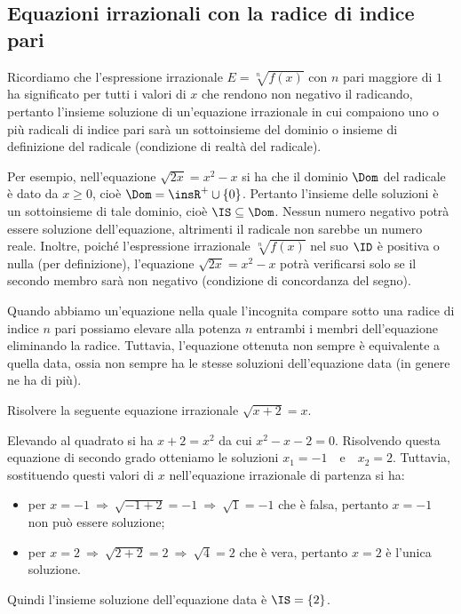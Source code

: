 \subsection{Equazioni irrazionali con la radice di indice pari}

Ricordiamo che l'espressione irrazionale $E=\sqrt[n]{f(x)}$ con $n$ pari maggiore di $1$ ha significato per tutti i valori di $x$ che rendono non negativo il radicando, pertanto l'insieme soluzione di un'equazione irrazionale in cui compaiono uno o più radicali di indice pari sarà un sottoinsieme del dominio o insieme di definizione del radicale (condizione di realtà del radicale).

Per esempio, nell'equazione $\sqrt{2x}=x^2-x$ si ha che il dominio $\Dom$ del radicale è dato da $x\ge 0$, cioè $\Dom=\insR^{+}\cup \{0\}$. Pertanto l'insieme delle soluzioni è un sottoinsieme di tale dominio, cioè $\IS\subseteq \Dom$. Nessun numero negativo potrà essere soluzione dell'equazione, altrimenti il radicale non sarebbe un numero reale.
Inoltre, poiché l'espressione irrazionale $\sqrt[n]{f(x)}$ nel suo $\ID$ è positiva o nulla (per definizione), l'equazione $\sqrt{2x}=x^2-x$ potrà verificarsi solo se il secondo membro sarà non negativo (condizione di concordanza del segno).

Quando abbiamo un'equazione nella quale l'incognita compare sotto una radice di indice $n$ pari possiamo elevare alla potenza $n$ entrambi i membri dell'equazione eliminando la radice. Tuttavia, l'equazione ottenuta non sempre è equivalente a quella data, ossia non sempre ha le stesse soluzioni dell'equazione data (in genere ne ha di più).

\begin{exrig}
\begin{esempio}
Risolvere la seguente equazione irrazionale $ \sqrt{x+2}=x $.

Elevando al quadrato si ha $x+2=x^2$ da cui $x^2-x-2=0$. Risolvendo questa equazione di secondo grado otteniamo le soluzioni $x_1=-1$~~e~~$x_2=2$. Tuttavia, sostituendo questi valori di $x$ nell'equazione irrazionale di partenza si ha:
\begin{itemize}
\item per $x=-1 \:\Rightarrow\: \sqrt{-1+2}=-1 \:\Rightarrow\: \sqrt 1=-1$ che è falsa, pertanto $x=-1$ non può essere soluzione;
\item per $x=2 \:\Rightarrow\: \sqrt{2+2}=2 \:\Rightarrow\: \sqrt 4=2$ che è vera, pertanto $x=2$ è l'unica soluzione.
\end{itemize}

Quindi l'insieme soluzione dell'equazione data è $\IS=\{2\}$.
\end{esempio}
\end{exrig}

